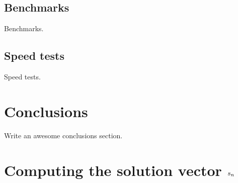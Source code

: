 \documentclass[modern]{aastex61}
\begin{document}
\subsection{Benchmarks}
\label{sec:starrybenchmarks}

Benchmarks.

\subsection{Speed tests}
\label{sec:starryspeed}

Speed tests.

\pagebreak
\section{Conclusions}
\label{sec:conclusions}

Write an awesome conclusions section.

%


\pagebreak
\appendix
\section{Computing the solution vector $\MakeLowercase{s_n}$}
\label{sec:solutionvector}
\end{document}
